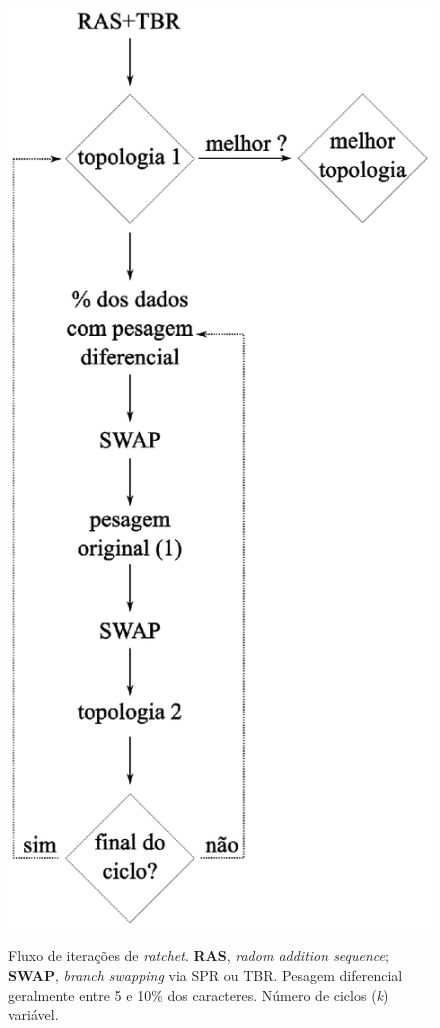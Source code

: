 \begin{refsection}
  \begin{figure}[H]
      {\includegraphics[scale=0.80]{figures/tut5/ratchet.eps}}
	{\caption[Fluxo de iterações de \textit{ratchet}]{Fluxo de iterações de \textit{ratchet}. \textbf{RAS}, \textit{radom addition sequence}; \textbf{SWAP}, \textit{branch swapping} via SPR ou TBR. Pesagem diferencial geralmente entre 5 e 10\% dos caracteres. Número de ciclos (\textit{k}) variável.}\label{tut5:fig:ratchet}}
  \end{figure}


\end{refsection}
